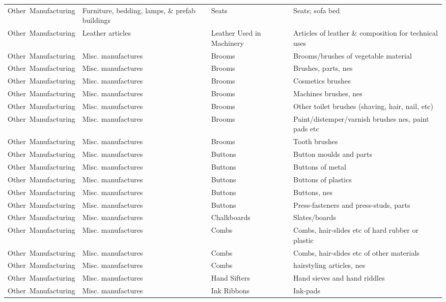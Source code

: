 \begin{appendices}
\begin{xltabular}{\textwidth}{|p{0.11\textwidth}|p{0.29\textwidth}|p{0.20\textwidth}|p{0.30\textwidth}|}
			Other\ Manufacturing & Furniture, bedding, lamps, \& prefab buildings & Seats & Seats; sofa bed \\
			Other\ Manufacturing & Leather articles & Leather Used in Machinery & Articles of leather \& composition for technical uses \\
			Other\ Manufacturing & Misc. manufactures & Brooms & Brooms/brushes of vegetable material \\
			Other\ Manufacturing & Misc. manufactures & Brooms & Brushes, parts, nes \\
			Other\ Manufacturing & Misc. manufactures & Brooms & Cosmetics brushes \\
			Other\ Manufacturing & Misc. manufactures & Brooms & Machines brushes, nes \\
			Other\ Manufacturing & Misc. manufactures & Brooms & Other toilet brushes (shaving, hair, nail, etc) \\
			Other\ Manufacturing & Misc. manufactures & Brooms & Paint/distemper/varnish brushes nes, paint pads etc \\
			Other\ Manufacturing & Misc. manufactures & Brooms & Tooth brushes \\
			Other\ Manufacturing & Misc. manufactures & Buttons & Button moulds and parts \\
			Other\ Manufacturing & Misc. manufactures & Buttons & Buttons of metal \\
			Other\ Manufacturing & Misc. manufactures & Buttons & Buttons of plastics \\
			Other\ Manufacturing & Misc. manufactures & Buttons & Buttons, nes \\
			Other\ Manufacturing & Misc. manufactures & Buttons & Press-fasteners and press-studs, parts \\
			Other\ Manufacturing & Misc. manufactures & Chalkboards & Slates/boards  \\
			Other\ Manufacturing & Misc. manufactures & Combs & Combs, hair-slides etc of hard rubber or plastic \\
			Other\ Manufacturing & Misc. manufactures & Combs & Combs, hair-slides etc of other materials \\
			Other\ Manufacturing & Misc. manufactures & Combs & hairstyling articles, nes \\
			Other\ Manufacturing & Misc. manufactures & Hand Sifters & Hand sieves and hand riddles \\
			Other\ Manufacturing & Misc. manufactures & Ink Ribbons & Ink-pads \\

\end{xltabular}
\end{appendices}

